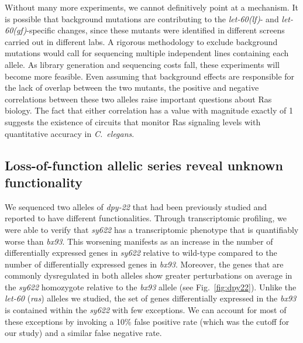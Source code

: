 \documentclass[10pt, onecolumn]{article}
\newcommand{\cel}{\emph{C.~elegans}}
\newcommand{\gene}[1]{\mbox{\emph{#1}}}
\newcommand{\ras}{\gene{let-60} (\emph{ras})}
\newcommand{\letgf}{\gene{let-60(gf)}}
\newcommand{\letlf}{\gene{let-60(lf)}}
\begin{document}
Without many more experiments, we cannot definitively point at a mechanism. It
is possible that background mutations are contributing to the \letlf{}- and
\letgf{}-specific changes, since these mutants were identified in different
screens carried out in different labs. A rigorous methodology to exclude background
mutations would call for sequencing multiple independent lines containing each
allele. As library generation and sequencing costs fall, these experiments will
become more feasible. Even assuming that background effects are responsible for the
lack of overlap between the two mutants, the positive and negative correlations
between these two alleles raise important questions about Ras biology. The fact
that either correlation has a value with magnitude exactly of 1 suggests the
existence of circuits that monitor Ras signaling levels with quantitative accuracy
in \cel{}.

\subsection*{Loss-of-function allelic series reveal unknown functionality}
We sequenced two alleles of \gene{dpy-22} that had been previously studied and
reported to have different functionalities. Through transcriptomic profiling,
we were able to verify that \emph{sy622} has a transcriptomic phenotype that is
quantifiably worse than \emph{bx93}. This worsening manifests as an increase in
the number of differentially expressed genes in \emph{sy622} relative to
wild-type compared to the number of differentially expressed genes in
\emph{bx93}. Moreover, the genes that are commonly dysregulated in both alleles
show greater perturbations on average in the \emph{sy622} homozygote relative
to the \emph{bx93} allele (see Fig.~\ref{fig:dpy22}). Unlike the \ras{} alleles
we studied, the set of genes differentially expressed in the \emph{bx93} is
contained within the \emph{sy622} with few exceptions. We can account for most of
these exceptions by invoking a 10\% false positive rate (which was the cutoff for our
study) and a similar false negative rate.
\end{document}
